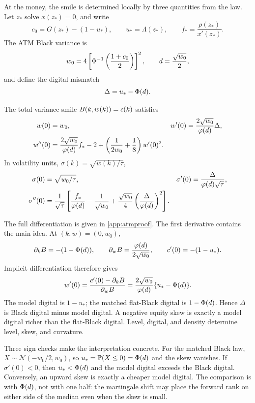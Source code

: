 At the money, the smile is determined locally by three quantities from the
law.  Let $z_*$ solve $x(z_*)=0$, and write
\begin{equation}
c_0=G(z_*)-(1-u_*),\qquad
u_*=\Lambda(z_*),\qquad
f_*=\frac{\rho(z_*)}{x'(z_*)}.
\label{eq:atm_inputs}
\end{equation}
The ATM Black variance is
\[
w_0=4\left[\Phi^{-1}\left(\frac{1+c_0}{2}\right)\right]^2,
\qquad d=\frac{\sqrt{w_0}}2,
\]
and define the digital mismatch
\begin{equation}
\Delta=u_*-\Phi(d).
\label{eq:digitalgap}
\end{equation}

\begin{proposition}
\label{prop:atm}
The total-variance smile $B(k,w(k))=c(k)$ satisfies
\begin{align}
w(0)&=w_0,
&w'(0)&=\frac{2\sqrt{w_0}}{\varphi(d)}\Delta,
\label{eq:atm_w}\\
w''(0)&=\frac{2\sqrt{w_0}}{\varphi(d)}f_*-2
+\left(\frac1{2w_0}+\frac18\right)w'(0)^2.
\label{eq:atm_wpp}
\end{align}
In volatility units, $\sigma(k)=\sqrt{w(k)/\tau}$,
\begin{align}
\sigma(0)&=\sqrt{w_0/\tau},
&\sigma'(0)&=\frac{\Delta}{\varphi(d)\sqrt\tau},
\label{eq:atm_sigma1}\\
\sigma''(0)&=\frac1{\sqrt\tau}
\left[\frac{f_*}{\varphi(d)}-\frac1{\sqrt{w_0}}
+\frac{\sqrt{w_0}}4\left(\frac{\Delta}{\varphi(d)}\right)^2\right].
\label{eq:atm_sigma}
\end{align}
\end{proposition}

The full differentiation is given in \cref{app:atmproof}.  The first
derivative contains the main idea.  At $(k,w)=(0,w_0)$,
\[
\partial_kB=-(1-\Phi(d)),
\qquad
\partial_wB=\frac{\varphi(d)}{2\sqrt{w_0}},
\qquad
c'(0)=-(1-u_*).
\]
Implicit differentiation therefore gives
\begin{equation}
w'(0)=\frac{c'(0)-\partial_kB}{\partial_wB}
=\frac{2\sqrt{w_0}}{\varphi(d)}\{u_*-\Phi(d)\}.
\label{eq:skewderivation}
\end{equation}
The model digital is $1-u_*$; the matched flat-Black digital is
$1-\Phi(d)$.  Hence $\Delta$ is Black digital minus model digital.  A
negative equity skew is exactly a model digital richer than the flat-Black
digital.  Level, digital, and density determine level, skew, and curvature.

Three sign checks make the interpretation concrete.  For the matched Black
law, $X\sim\mathcal N(-w_0/2,w_0)$, so
$u_*=\mathbb{P}(X\le0)=\Phi(d)$ and the skew vanishes.  If
$\sigma'(0)<0$, then $u_*<\Phi(d)$ and the model digital exceeds the Black
digital.  Conversely, an upward skew is exactly a cheaper model digital.
The comparison is with $\Phi(d)$, not with one half: the martingale shift may
place the forward rank on either side of the median even when the skew is
small.

